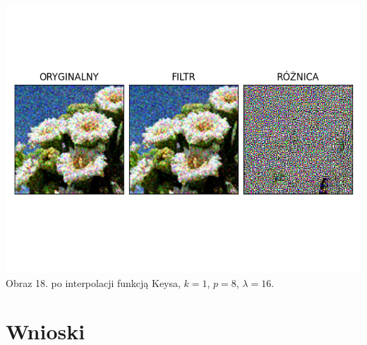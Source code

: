 \documentclass[14pt]{article}
\begin{document}
\begin{center}
    \includegraphics[scale=0.7]{images/keys_poisson16x_k1_p7.png}
    \\ \small Obraz 18. po interpolacji funkcją Keysa,
    $k=1$, $p=8$, $\lambda=16$.


\end{center}

\newpage
\section{Wnioski}
\end{document}
